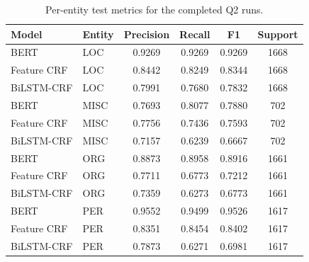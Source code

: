 \begin{table}[H]
\centering
\small
\begin{tabular}{llcccc}
\toprule
Model & Entity & Precision & Recall & F1 & Support \\
\midrule
BERT & LOC & 0.9269 & 0.9269 & 0.9269 & 1668 \\
Feature CRF & LOC & 0.8442 & 0.8249 & 0.8344 & 1668 \\
BiLSTM-CRF & LOC & 0.7991 & 0.7680 & 0.7832 & 1668 \\
\midrule
BERT & MISC & 0.7693 & 0.8077 & 0.7880 & 702 \\
Feature CRF & MISC & 0.7756 & 0.7436 & 0.7593 & 702 \\
BiLSTM-CRF & MISC & 0.7157 & 0.6239 & 0.6667 & 702 \\
\midrule
BERT & ORG & 0.8873 & 0.8958 & 0.8916 & 1661 \\
Feature CRF & ORG & 0.7711 & 0.6773 & 0.7212 & 1661 \\
BiLSTM-CRF & ORG & 0.7359 & 0.6273 & 0.6773 & 1661 \\
\midrule
BERT & PER & 0.9552 & 0.9499 & 0.9526 & 1617 \\
Feature CRF & PER & 0.8351 & 0.8454 & 0.8402 & 1617 \\
BiLSTM-CRF & PER & 0.7873 & 0.6271 & 0.6981 & 1617 \\
\bottomrule
\end{tabular}
\caption{Per-entity test metrics for the completed Q2 runs.}
\label{tab:q2_per_entity_results}
\end{table}